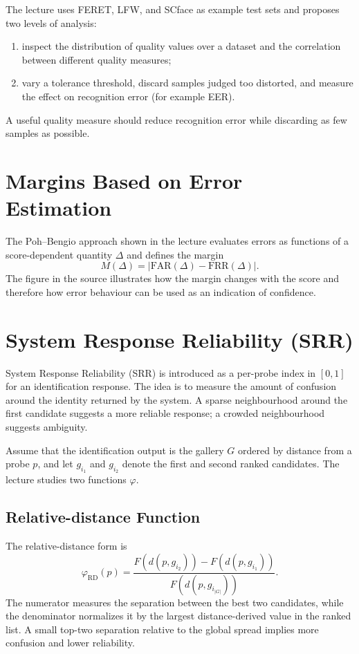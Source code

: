 \documentclass[11pt,a4paper,oneside]{report}
\begin{document}
The lecture uses FERET, LFW, and SCface as example test sets and proposes two
levels of analysis:
\begin{enumerate}
    \item inspect the distribution of quality values over a dataset and the
          correlation between different quality measures;
    \item vary a tolerance threshold, discard samples judged too distorted,
          and measure the effect on recognition error (for example EER).
\end{enumerate}
A useful quality measure should reduce recognition error while discarding as few
samples as possible.

\section{Margins Based on Error Estimation}
\label{sec:error-margin-reliability}

The Poh--Bengio approach shown in the lecture evaluates errors as functions of a
score-dependent quantity $\Delta$ and defines the margin
\[
    M(\Delta)=\left|\mathrm{FAR}(\Delta)-\mathrm{FRR}(\Delta)\right|.
\]
The figure in the source illustrates how the margin changes with the score and
therefore how error behaviour can be used as an indication of confidence.

\section{System Response Reliability (SRR)}
\label{sec:srr}

System Response Reliability (SRR) is introduced as a per-probe index in
$[0,1]$ for an identification response.  The idea is to measure the amount of
confusion around the identity returned by the system.  A sparse neighbourhood
around the first candidate suggests a more reliable response; a crowded
neighbourhood suggests ambiguity.

Assume that the identification output is the gallery $G$ ordered by distance
from a probe $p$, and let $g_{i_1}$ and $g_{i_2}$ denote the first and second
ranked candidates.  The lecture studies two functions $\varphi$.

\subsection{Relative-distance Function}

The relative-distance form is
\[
\varphi_{\mathrm{RD}}(p)=
\frac{F(d(p,g_{i_2}))-F(d(p,g_{i_1}))}
     {F(d(p,g_{i_{|G|}}))}.
\]
The numerator measures the separation between the best two candidates, while
the denominator normalizes it by the largest distance-derived value in the
ranked list.  A small top-two separation relative to the global spread implies
more confusion and lower reliability.
\end{document}
